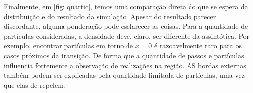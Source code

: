 Finalmente, em \ref{fig: quartic}, temos uma comparação direta do que se espera da distribuição e do resultado da simulação. Apesar do resultado parecer discordante, alguma ponderação pode esclarecer as coisas. Para a quantidade de partículas consideradas, a densidade deve, claro, ser diferente da assintótica. Por exemplo, encontrar partículas em torno de $x=0$ é razoavelmente raro para os casos próximos da transição. De forma que a quantidade de passos e partículas influencia fortemente a observação de realizações na região. AS bordas externas também podem ser explicadas pela quantidade limitada de partículas, uma vez que elas de repelem. 

